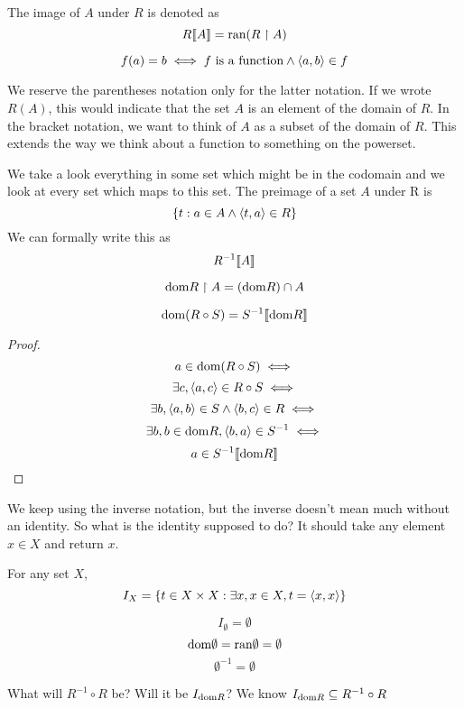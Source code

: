 \begin{defn}
The image of $A$ under $R$ is denoted as
\[R \llbracket A\rrbracket = \text{ran} (R \upharpoonright A)\]
\end{defn}
\begin{defn}
\[f(a) = b \iff f \text{ is a function} \wedge \langle a, b\rangle \in f\]
\end{defn}
\begin{rem}
We reserve the parentheses notation only for the latter notation. If we wrote
$R(A)$, this would indicate that the set $A$ is an element of the domain of $R$.
In the bracket notation, we want to think of $A$ as a subset of the domain of $R$. This 
extends the way we think about a function to something on the powerset.
\end{rem}
\begin{defn}[Preimage]
    We take a look everything in some set which might be in the codomain and we look at every
    set which maps to this set. The preimage of a set $A$ under R is
    \[\{t: a \in A \wedge \langle t, a\rangle \in R\}\]
    We can formally write this as 
    \[R^{-1}\llbracket A\rrbracket\]
\end{defn}
\begin{prop}
\[\text{dom} R \upharpoonright A = (\text{dom} R) \cap A\]
\end{prop}
\begin{prop}
\[\text{dom}(R \circ S) = S^{-1}\llbracket \text{dom} R\rrbracket\]
\end{prop}
\begin{proof}
\[a \in \text{dom} (R \circ S) \iff\]
\[\exists c, \langle a, c\rangle \in R \circ S \iff\]
\[\exists b, \langle a , b\rangle \in S \wedge \langle b, c\rangle \in R \iff\]
\[\exists b, b \in \text{dom} R, \langle b, a\rangle \in S^{-1} \iff\]
\[a \in S^{-1}\llbracket \text{dom} R\rrbracket\]
\end{proof}
\begin{rem}
We keep using the inverse notation, but the inverse doesn't mean much without
an identity. So what is the identity supposed to do? It should take any element $x \in X$ and return $x$.
\end{rem}
\begin{defn}
For any set $X$,
\[I_X = \{t \in X \times X: \exists x, x \in X, t = \langle x, x\rangle\}\]
\end{defn}
\begin{ex}
\[I_\emptyset = \emptyset\]
\[\text{dom} \emptyset = \text{ran} \emptyset = \emptyset\]
\[\emptyset^{-1} = \emptyset\]
\end{ex}
\begin{prop}
What will $R^{-1}\circ R$ be? Will it be $I_{\text{dom} R}$?
We know $I_{\text{dom} R} \subseteq R^{-1}\circ R$
\end{prop}
